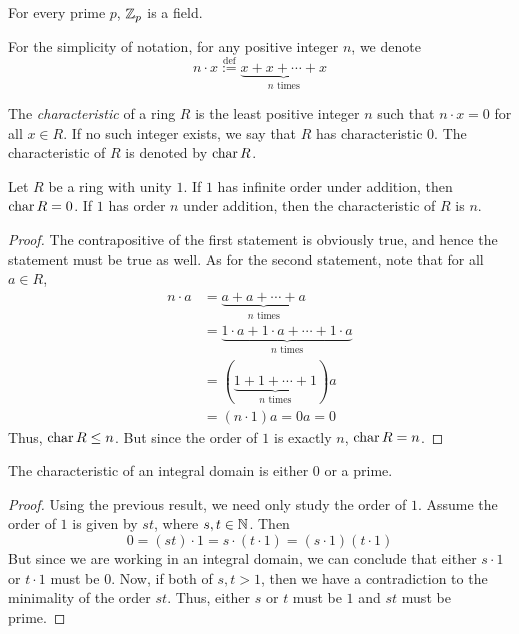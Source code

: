 \begin{corollary}
	For every prime $p$, $\mathbb{Z}_{p}$ is a field.
\end{corollary}

For the simplicity of notation, for any positive integer $n$, we denote 
$$
n\cdot x\stackrel{\text{def}}{:=} \underbrace{x+x+\cdots+x}_{n\text{ times}}
$$

\begin{definition}
	The \textit{characteristic} of a ring $R$ is the least positive integer $n$ such that $n\cdot x=0$ for all $x\in R$. If no such integer exists, we say that $R$ has characteristic $0$. The characteristic of $R$ is denoted by $\operatorname{char} R$.
\end{definition}

\begin{proposition}
	Let $R$ be a ring with unity $1$. If $1$ has infinite order under addition, then $\operatorname{char} R=0$. If $1$ has order $n$ under addition, then the characteristic of $R$ is $n$.
\end{proposition}
\begin{proof}
	The contrapositive of the first statement is obviously true, and hence the statement must be true as well. As for the second statement, note that for all $a\in R$,
	\begin{align*}
	n\cdot a &= \underbrace{a+a+\cdots+a}_{n \text{ times}}\\
	&= \underbrace{1\cdot a+1\cdot a+\cdots+1\cdot a}_{n\text{ times}}\\
	&= (\underbrace{1+1+\cdots+1}_{n\text{ times}})a\\
	&= (n\cdot1)a = 0a = 0
	\end{align*}
	Thus, $\operatorname{char} R\le n$. But since the order of $1$ is exactly $n$, $\operatorname{char} R=n$.
\end{proof}

\begin{proposition}
	The characteristic of an integral domain is either $0$ or a prime.
\end{proposition}
\begin{proof}
	Using the previous result, we need only study the order of $1$. Assume the order of $1$ is given by $st$, where $s,t\in\mathbb{N}$. Then
	$$
	0=(st)\cdot 1 = s\cdot(t\cdot 1) = (s\cdot 1)(t\cdot 1)
	$$
	But since we are working in an integral domain, we can conclude that either $s\cdot 1$ or $t\cdot 1$ must be $0$. Now, if both of $s,t>1$, then we have a contradiction to the minimality of the order $st$. Thus, either $s$ or $t$ must be $1$ and $st$ must be prime.
\end{proof}